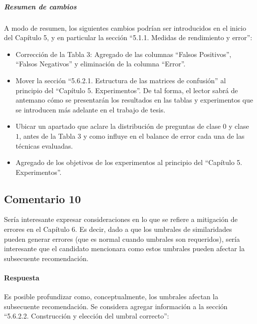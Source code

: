 \subparagraph{Resumen de cambios}
A modo de resumen, los siguientes cambios podrían ser introducidos en el inicio del Capítulo 5, y en particular la sección ``5.1.1. Medidas de rendimiento y error'':
\begin{itemize}
	\item Corrección de la Tabla 3: Agregado de las columnas ``Falsos Positivos'', ``Falsos Negativos'' y eliminación de la columna ``Error''.
	\item Mover la sección ``5.6.2.1. Estructura de las matrices de confusión'' al principio del ``Capítulo 5. Experimentos''. De tal forma, el lector sabrá de antemano cómo se presentarán los resultados en las tablas y experimentos que se introducen más adelante en el trabajo de tesis.
	\item Ubicar un apartado que aclare la distribución de preguntas de clase \(0\) y clase \(1\), antes de la Tabla 3 y como influye en el balance de error cada una de las técnicas evaluadas.
	\item Agregado de los objetivos de los experimentos al principio del ``Capítulo 5. Experimentos''.
\end{itemize}

\subsection*{Comentario 10}
Sería interesante expresar consideraciones en lo que se refiere a mitigación de errores en el Capítulo 6. Es decir, dado a que los umbrales de similaridades pueden generar errores (que es normal cuando umbrales son requeridos), sería interesante que el candidato mencionara como estos umbrales pueden afectar la subsecuente recomendación.

\paragraph*{Respuesta}
Es posible profundizar como, conceptualmente, los umbrales afectan la subsecuente recomendación. Se considera agregar información a la sección ``5.6.2.2. Construcción y elección del umbral correcto'':

